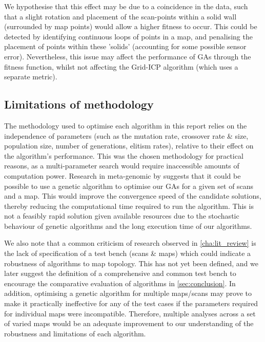 \documentclass[authoryearcitations]{UoYCSproject}
\begin{document}
We hypothesise that this effect may be due to a coincidence in the data, such that a slight rotation and placement of the scan-points within a solid wall (surrounded by map points) would allow a higher fitness to occur. This could be detected by identifying continuous loops of points in a map, and penalising the placement of points within these 'solids' (accounting for some possible sensor error). Nevertheless, this issue may affect the performance of GAs through the fitness function, whilst not affecting the Grid-ICP algorithm (which uses a separate metric).

\subsection{Limitations of methodology}
\label{subsec:methodology_limitations}
The methodology used to optimise each algorithm in this report relies on the independence of parameters (such as the mutation rate, crossover rate \& size, population size, number of generations, elitism rates), relative to their effect on the algorithm's performance. This was the chosen methodology for practical reasons, as a multi-parameter search would require inaccessible amounts of computation power. Research in meta-genomic by \citet{Brain2011-pz} suggests that it could be possible to use a genetic algorithm to optimise our GAs for a given set of scans and a map. This would improve the convergence speed of the candidate solutions, thereby reducing the computational time required to run the algorithm. This is not a feasibly rapid solution given available resources due to the stochastic behaviour of genetic algorithms and the long execution time of our algorithms. \newline

We also note that a common criticism of research observed in \autoref{cha:lit_review} is the lack of specification of a test bench (scans \& maps) which could indicate a robustness of algorithms to map topology. This has not yet been defined, and we later suggest the definition of a comprehensive and common test bench to encourage the comparative evaluation of algorithms in \autoref{sec:conclusion}. In addition, optimising a genetic algorithm for multiple maps/scans may prove to make it practically ineffective for any of the test cases if the parameters required for individual maps were incompatible. Therefore, multiple analyses across a set of varied maps would be an adequate improvement to our understanding of the robustness and limitations of each algorithm.
\end{document}
